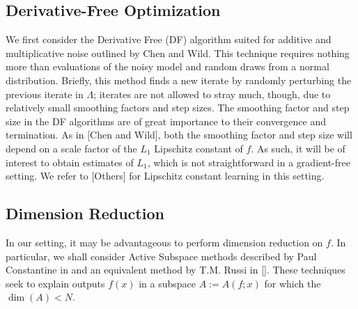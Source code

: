 \documentclass{amsart}
\begin{document}
\subsection{Derivative-Free Optimization}


We first consider the Derivative Free (DF) algorithm suited for additive and multiplicative noise outlined by Chen and Wild. This technique requires nothing more than evaluations of the noisy model and random draws from a normal distribution. Briefly, this method finds a new iterate by randomly perturbing the previous iterate in $\Lambda$; iterates are not allowed to stray much, though, due to relatively small smoothing factors and step sizes. The smoothing factor and step size in the DF algorithms are of great importance to their convergence and termination. As in [Chen and Wild], both the smoothing factor and step size will depend on a scale factor of the $L_1$ Lipschitz constant of $f$. As such, it will be of interest to obtain estimates of $L_1$, which is not straightforward in a gradient-free setting. We refer to [Others] for Lipschitz constant learning in this setting. 

\subsection{Dimension Reduction}

In our setting, it may be advantageous to perform dimension reduction on $f$. In particular, we shall consider Active Subspace methods described by Paul Constantine in \cite{Constantine} and an equivalent method by T.M. Russi in []. These techniques seek to explain outputs $f(x)$ in a subspace $A:=A(f;x)$ for which the $\dim (A) <N$. 

\end{document}
